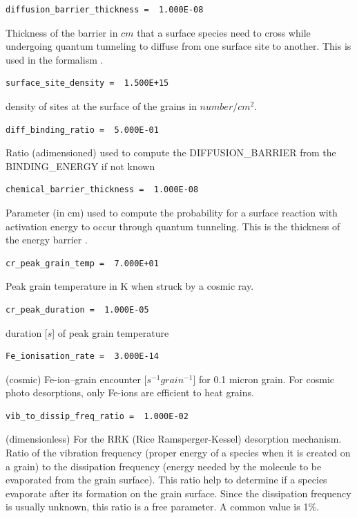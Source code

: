 \documentclass[english,a4paper,twoside]{article}
\begin{document}
\begin{verbatim}
diffusion_barrier_thickness =  1.000E-08
\end{verbatim}
Thickness of the barrier in $\unit{cm}$ that a surface species need to cross while undergoing quantum tunneling to diffuse from one surface site to another. This is used in the formalism \citep[see equation 10 (parameter a)]{1992ApJS...82..167H}.

\begin{verbatim}
surface_site_density =  1.500E+15
\end{verbatim}
density of sites at the surface of the grains in $\unit{number/cm^{2}}$.

\begin{verbatim}
diff_binding_ratio =  5.000E-01
\end{verbatim}
Ratio (adimensioned) used to compute the DIFFUSION\_BARRIER from the BINDING\_ENERGY if not known

\begin{verbatim}
chemical_barrier_thickness =  1.000E-08
\end{verbatim}
Parameter (in cm) used to compute the probability for a surface reaction with activation energy to occur through quantum tunneling. This is the thickness of the energy barrier \citep[See equation 6]{1992ApJS...82..167H}.

\begin{verbatim}
cr_peak_grain_temp =  7.000E+01
\end{verbatim}
Peak grain temperature in K when struck by a cosmic ray.

\begin{verbatim}
cr_peak_duration =  1.000E-05
\end{verbatim}
duration [$\unit{s}$] of peak grain temperature

\begin{verbatim}
Fe_ionisation_rate =  3.000E-14
\end{verbatim}
(cosmic) Fe-ion--grain encounter [$\unit{s^{-1} grain^{-1}}$] for 0.1 micron grain. For cosmic photo desorptions, only Fe-ions are efficient to heat grains. 

\begin{verbatim}
vib_to_dissip_freq_ratio =  1.000E-02
\end{verbatim}
(dimensionless) For the RRK (Rice Ramsperger-Kessel) desorption mechanism. Ratio of the vibration frequency (proper energy of a species when it is created on a grain) to the dissipation frequency (energy needed by the molecule to be evaporated from the grain surface). This ratio help to determine if a species evaporate after its formation on the grain surface. Since the dissipation frequency is usually unknown, this ratio is a free parameter. A common value is 1\%.
\end{document}
